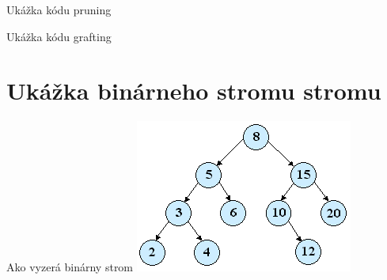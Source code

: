 \documentclass[10pt, hyperref={unicode}]{beamer}
\begin{document}
\label{kod5}

\begin{frame}{Ukážka kódu pruning}
        
\end{frame}

\label{kod6}

\begin{frame}{Ukážka kódu grafting}
        
\end{frame}

\section{Ukážka binárneho stromu stromu}
\begin{frame}{Ako vyzerá binárny strom}
        \includegraphics[width=\textwidth]{bvs1.png}
\end{frame}
\end{document}

